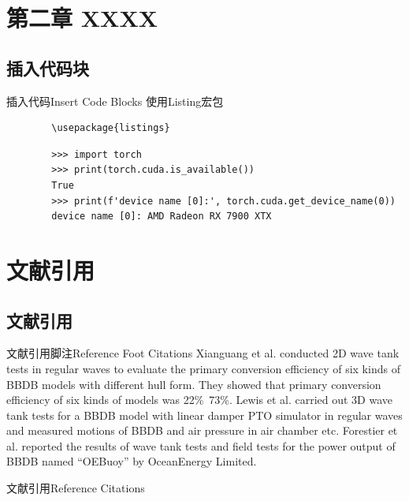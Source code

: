 \documentclass[aspectratio=169, UTF8]{ctexbeamer}
\begin{document}
\section{第二章 XXXX}
\subsection{插入代码块}
\begin{frame}[fragile]{插入代码}{Insert Code Blocks}
    使用Listing宏包\begin{verbatim}
        \usepackage{listings}
    \end{verbatim}
    \begin{lstlisting}
        >>> import torch
        >>> print(torch.cuda.is_available())
        True
        >>> print(f'device name [0]:', torch.cuda.get_device_name(0))
        device name [0]: AMD Radeon RX 7900 XTX
    \end{lstlisting}
\end{frame}

\section[Reference Citations]{文献引用}
\subsection{文献引用}
\begin{frame}{文献引用脚注}{Reference Foot Citations}
    Xianguang et al. conducted 2D wave tank tests in regular waves to evaluate the primary conversion efficiency of six kinds of BBDB models with different hull form. They showed that primary conversion efficiency of six kinds of models was 22\%~73\%. Lewis et al.  carried out 3D wave tank tests for a BBDB model with linear damper PTO simulator in regular waves and measured motions of BBDB and air pressure in air chamber etc. Forestier et al.  reported the results of wave tank tests and field tests for the power output of BBDB named “OEBuoy” by OceanEnergy Limited.
\end{frame}

\begin{frame}{文献引用}{Reference Citations}
    \printbibliography[heading=bibintoc]
    \insertframetitle
\end{frame}
\end{document}
